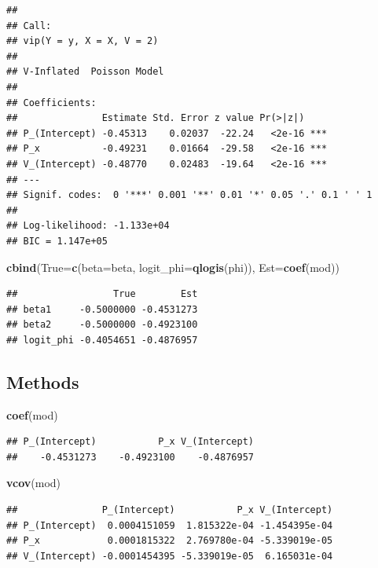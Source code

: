\documentclass[]{article}
\newenvironment{Shaded}{\begin{snugshade}}{\end{snugshade}}
\newcommand{\KeywordTok}[1]{\textcolor[rgb]{0.13,0.29,0.53}{\textbf{#1}}}
\newcommand{\DataTypeTok}[1]{\textcolor[rgb]{0.13,0.29,0.53}{#1}}
\newcommand{\NormalTok}[1]{#1}
\begin{document}
\begin{verbatim}
## 
## Call:
## vip(Y = y, X = X, V = 2)
## 
## V-Inflated  Poisson Model
## 
## Coefficients:
##               Estimate Std. Error z value Pr(>|z|)    
## P_(Intercept) -0.45313    0.02037  -22.24   <2e-16 ***
## P_x           -0.49231    0.01664  -29.58   <2e-16 ***
## V_(Intercept) -0.48770    0.02483  -19.64   <2e-16 ***
## ---
## Signif. codes:  0 '***' 0.001 '**' 0.01 '*' 0.05 '.' 0.1 ' ' 1 
## 
## Log-likelihood: -1.133e+04 
## BIC = 1.147e+05
\end{verbatim}

\begin{Shaded}
\begin{Highlighting}[]
\KeywordTok{cbind}\NormalTok{(}\DataTypeTok{True=}\KeywordTok{c}\NormalTok{(}\DataTypeTok{beta=}\NormalTok{beta, }\DataTypeTok{logit_phi=}\KeywordTok{qlogis}\NormalTok{(phi)),}
      \DataTypeTok{Est=}\KeywordTok{coef}\NormalTok{(mod))}
\end{Highlighting}
\end{Shaded}

\begin{verbatim}
##                 True        Est
## beta1     -0.5000000 -0.4531273
## beta2     -0.5000000 -0.4923100
## logit_phi -0.4054651 -0.4876957
\end{verbatim}

\subsection{Methods}\label{methods}

\begin{Shaded}
\begin{Highlighting}[]
\KeywordTok{coef}\NormalTok{(mod)}
\end{Highlighting}
\end{Shaded}

\begin{verbatim}
## P_(Intercept)           P_x V_(Intercept) 
##    -0.4531273    -0.4923100    -0.4876957
\end{verbatim}

\begin{Shaded}
\begin{Highlighting}[]
\KeywordTok{vcov}\NormalTok{(mod)}
\end{Highlighting}
\end{Shaded}

\begin{verbatim}
##               P_(Intercept)           P_x V_(Intercept)
## P_(Intercept)  0.0004151059  1.815322e-04 -1.454395e-04
## P_x            0.0001815322  2.769780e-04 -5.339019e-05
## V_(Intercept) -0.0001454395 -5.339019e-05  6.165031e-04
\end{verbatim}
\end{document}

